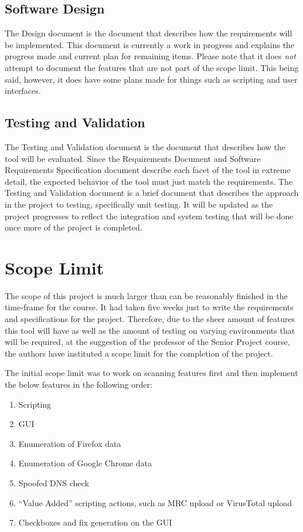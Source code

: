 \documentclass[letterpaper,12pt]{article}
\begin{document}
\subsection{Software Design}
\label{software_design}
The Design document \cite{Design} is the document that describes how the
requirements will be implemented.  This document is currently a work in progress
and explains the progress made and current plan for remaining items.  Please
note that it does \textit{not} attempt to document the features that are not
part of the scope limit.  This being said, however, it does have some plans made
for things such as scripting and user interfaces.  

\subsection{Testing and Validation}
\label{testing_and_evaluation}
The Testing and Validation document \cite{Testing} is the document that
describes how the tool will be evaluated.  Since the Requirements
Document \cite{Requirements} and Software Requirements Specification
\cite{Specification} document describe each facet of the tool in extreme
detail, the expected behavior of the tool must just match the requirements.  The
Testing and Validation document is a brief document that describes the approach
in the project to testing, specifically unit testing.  It will be updated as the
project progresses to reflect the integration and system testing that will be
done once more of the project is completed.

\newpage



\section{Scope Limit} \label{scope_limit}
The scope of this project is much larger than can be reasonably finished in the
time-frame for the course.  It had taken five weeks just to write the
requirements and specifications for the project.  Therefore, due to the sheer
amount of features this tool will have as well as the amount of testing on
varying environments that will be required, at the suggestion of the professor
of the Senior Project course, the authors have instituted a scope limit for the
completion of the project.  

The initial scope limit was to work on scanning features first and then
implement the below features in the following order:
\begin{enumerate}
    \item Scripting 
    \item GUI 
    \item Enumeration of Firefox data
    \item Enumeration of Google Chrome data
    \item Spoofed DNS check
    \item ``Value Added'' scripting actions, such as MRC upload or VirusTotal
    upload
    \item Checkboxes and fix generation on the GUI
\end{enumerate}
\end{document}

